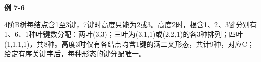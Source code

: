 {\color{ink}\bfseries 例 7-6}\par\vspace{1bp}4阶B树每结点含1至3键，7键时高度只能为2或3。高度2时，根含1、2、3键分别有1、6、1种叶键数分配：两叶(3,\allowbreak{}3)；三叶为(3,\allowbreak{}1,\allowbreak{}1)或(2,\allowbreak{}2,\allowbreak{}1)的各3种排列；四叶(1,\allowbreak{}1,\allowbreak{}1,\allowbreak{}1)，共8种。高度3时仅有各结点均含1键的满二叉形态，共计9种，对应C；给定有序关键字后，每种形态的键分配唯一。
